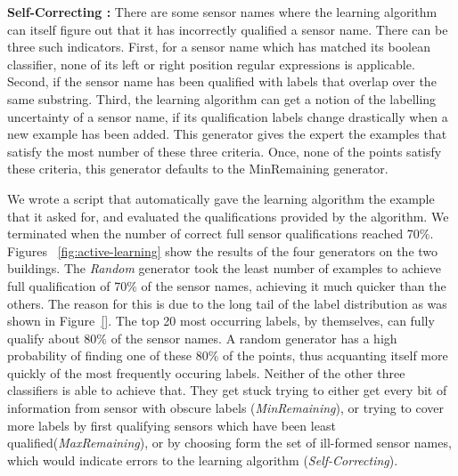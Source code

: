 {\bf Self-Correcting :} There are some sensor names where the learning algorithm can itself figure out that it has incorrectly qualified a sensor name. There can be three such indicators. First, for a sensor name which has matched its boolean classifier, none of its left or right position regular expressions is applicable. Second, if the sensor name has been qualified with labels that overlap over the same substring. Third, the learning algorithm can get a notion of the labelling uncertainty of a sensor name, if its qualification labels change drastically when a new example has been added. This generator gives the expert the examples that satisfy the most number of these three criteria. Once, none of the points satisfy these criteria, this generator defaults to the MinRemaining generator.


We wrote a script that automatically gave the learning algorithm the example that it asked for, and evaluated the qualifications provided by the algorithm. We terminated when the number of correct full sensor qualifications reached 70\%. Figures ~\ref{fig:active-learning} show the results of the four generators on the two buildings. The \emph{Random} generator took the least number of examples to achieve full qualification of 70\% of the sensor names, achieving it much quicker than the others. The reason for this is due to the long tail of the label distribution as was shown in Figure~\ref{}. The top 20 most occurring labels, by themselves, can fully qualify about 80\% of the sensor names. A random generator has a high probability of finding one of these 80\% of the points, thus acquanting itself more quickly of the most frequently occuring labels. Neither of the other three classifiers is able to achieve that. They get stuck trying to either get every bit of information from sensor with obscure labels (\emph{MinRemaining}), or trying to cover more labels by first qualifying sensors which have been least qualified(\emph{MaxRemaining}), or by choosing form the set of ill-formed sensor names, which would indicate errors to the learning algorithm (\emph{Self-Correcting}).

